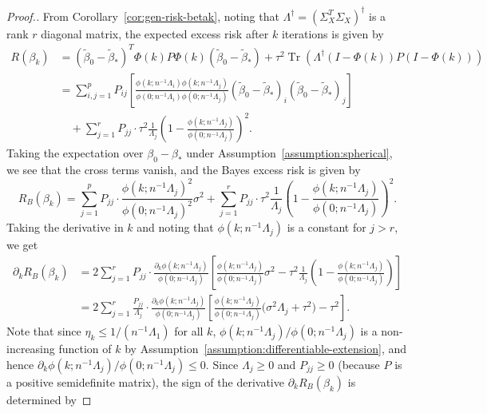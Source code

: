 \documentclass[10pt,a4paper]{amsart}
\DeclareMathOperator{\Tr}{Tr}
\begin{document}
\begin{proof}[Proof.]
From Corollary~\ref{cor:gen-risk-betak}, noting that $\Lambda^\dagger = (\Sigma_X^T \Sigma_X)^{\dagger}$ is a rank $r$ diagonal matrix, the expected excess risk after $k$ iterations is given by
\begin{align*} 
    R(\beta_k) &= (\tilde{\beta}_0 - \tilde{\beta}_*)^T \Phi(k) P \Phi(k) (\tilde{\beta}_0 - \tilde{\beta}_*) + \tau^2\Tr\left( \Lambda^\dagger (I-\Phi(k))P(I-\Phi(k)) \right)\\
    &= \sum_{i,j=1}^p P_{ij} \left[\frac{\phi(k; n^{-1}\Lambda_i)\phi(k; n^{-1}\Lambda_j)}{\phi(0; n^{-1}\Lambda_i)\phi(0; n^{-1}\Lambda_j)}(\tilde{\beta}_0 - \tilde{\beta}_*)_i(\tilde{\beta}_0 - \tilde{\beta}_*)_j \right] \\
    &\quad+ \sum_{j=1}^r P_{jj} \cdot \tau^2\frac{1}{\Lambda_j}\left(1-\frac{\phi(k; n^{-1}\Lambda_j)}{\phi(0; n^{-1}\Lambda_j)}\right)^2.
\end{align*}
Taking the expectation over $\beta_0 - \beta_*$ under Assumption~\ref{assumption:spherical}, we see that the cross terms vanish, and the Bayes excess risk is given by
\begin{equation} \label{eq:earlystopping_1}
    R_B(\beta_k) = \sum_{j=1}^{p} P_{jj} \cdot \frac{\phi(k;n^{-1}\Lambda_j)^2}{\phi(0;n^{-1}\Lambda_j)^2}\sigma^2 
    + \sum_{j=1}^r P_{jj} \cdot \tau^2\frac{1}{\Lambda_j}\left(1-\frac{\phi(k; n^{-1}\Lambda_j)}{\phi(0; n^{-1}\Lambda_j)}\right)^2.
\end{equation}
Taking the derivative in $k$ and noting that $\phi(k; n^{-1}\Lambda_j)$ is a constant for $j > r$, we get
\begin{align}
    \partial_k R_B(\beta_k)
    &= 2\sum_{j=1}^r P_{jj} \cdot \frac{\partial_k \phi(k; n^{-1}\Lambda_j)}{\phi(0; n^{-1}\Lambda_j)} \left[\frac{\phi(k; n^{-1}\Lambda_j)}{\phi(0; n^{-1}\Lambda_j)}\sigma^2 - \tau^2 \frac{1}{\Lambda_j}\left(1-\frac{\phi(k; n^{-1}\Lambda_j)}{\phi(0;n^{-1}\Lambda_j)}\right) \right] \nonumber\\
    &= 2\sum_{j=1}^r \frac{P_{jj}}{\Lambda_j} \cdot \frac{\partial_k \phi(k; n^{-1}\Lambda_j)}{\phi(0; n^{-1}\Lambda_j)} \left[\frac{\phi(k;n^{-1}\Lambda_j)}{\phi(0; n^{-1}\Lambda_j)} \Big(\sigma^2 \Lambda_j + \tau^2\Big) - \tau^2  \right]. \label{eq:risk-derivative-mu0}
\end{align}
Note that since $\eta_k \le 1/(n^{-1} \Lambda_1)$ for all $k$, $\phi(k; n^{-1}\Lambda_j) / \phi(0; n^{-1} \Lambda_j)$ is a non-increasing function of $k$ by Assumption~\ref{assumption:differentiable-extension}, and hence $\partial_k \phi(k; n^{-1}\Lambda_j) / \phi(0; n^{-1} \Lambda_j) \leq 0$. Since $\Lambda_j \ge 0$ and $P_{jj} \geq 0$ (because $P$ is a positive semidefinite matrix), the sign of the derivative $\partial_k R_B(\beta_k)$ is determined by 

\end{proof}
\end{document}
